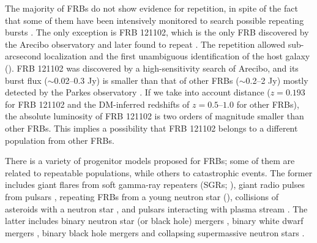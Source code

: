\documentclass[]{pasj01}
\begin{document}
The majority of FRBs do not show evidence for repetition, in spite of
the fact that some of them have been intensively monitored to search
possible repeating bursts \citep{Lorimer2007,Petroff2015}.  The only
exception is FRB 121102, which is the only FRB discovered by the
Arecibo observatory \citep{Spitler2014} and later found to repeat
\citep{Spitler:2016uq,Scholz:2016rpt}. The repetition allowed
sub-arcsecond localization and the first unambiguous identification of
the host galaxy (\cite{Chatterjee2017,Marcote2017,Tendulkar2017}). FRB
121102 was discovered by a high-sensitivity search of Arecibo, and its
burst flux ($\sim$0.02--0.3 Jy) is smaller than that of other FRBs
($\sim$0.2--2 Jy) mostly detected by the Parkes observatory
\citep{Spitler:2016uq}.  If we take into account distance ($z = 0.193$
for FRB 121102 and the DM-inferred redshifts of $z=0.5$--$1.0$ for
other FRBs), the absolute luminosity of FRB 121102 is two orders of
magnitude smaller than other FRBs.  This implies a possibility that
FRB 121102 belongs to a different population from other FRBs.

There is a variety of progenitor models proposed for FRBs; some of
them are related to repeatable populations, while others to
catastrophic events. The former includes giant flares from soft
gamma-ray repeaters (SGRs;
\cite{Popov2010,Thornton2013,Lyubarsky2014,Kulkarni2014}), giant radio
pulses from pulsars \citep{Connor2016,Cordes&Wasserman2016}, repeating
FRBs from a young neutron star
(\cite{Kashiyama&Murase2017,Metzger2017,Beloborodov2017}), collisions
of asteroids with a neutron star \citep{Geng&Huang2015,Dai2016}, and
pulsars interacting with plasma stream \citep{Zhang2017}. The latter
includes binary neutron star (or black hole) mergers
\citep{Totani2013,Mingarelli2015}, binary white dwarf mergers
\citep{Kashiyama2013}, binary black hole mergers \citep{Liu2016} and collapsing supermassive neutron stars
\citep{Falcke&Rezzolla2014}.
\end{document}
